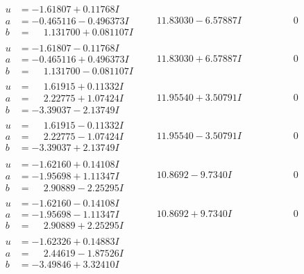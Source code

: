 \documentclass[1p]{elsarticle_modified}
\theoremstyle{definition}
\begin{document}
$$\begin{array}{c|c|c}
\begin{aligned}
u &= -1.61807 + 0.11768 I \\
a &= -0.465116 - 0.496373 I \\
b &= \phantom{-}1.131700 + 0.081107 I\end{aligned}
 & \phantom{-}11.83030 - 6.57887 I & \phantom{-0.000000 } 0 \\ \hline\begin{aligned}
u &= -1.61807 - 0.11768 I \\
a &= -0.465116 + 0.496373 I \\
b &= \phantom{-}1.131700 - 0.081107 I\end{aligned}
 & \phantom{-}11.83030 + 6.57887 I & \phantom{-0.000000 } 0 \\ \hline\begin{aligned}
u &= \phantom{-}1.61915 + 0.11332 I \\
a &= \phantom{-}2.22775 + 1.07424 I \\
b &= -3.39037 - 2.13749 I\end{aligned}
 & \phantom{-}11.95540 + 3.50791 I & \phantom{-0.000000 } 0 \\ \hline\begin{aligned}
u &= \phantom{-}1.61915 - 0.11332 I \\
a &= \phantom{-}2.22775 - 1.07424 I \\
b &= -3.39037 + 2.13749 I\end{aligned}
 & \phantom{-}11.95540 - 3.50791 I & \phantom{-0.000000 } 0 \\ \hline\begin{aligned}
u &= -1.62160 + 0.14108 I \\
a &= -1.95698 + 1.11347 I \\
b &= \phantom{-}2.90889 - 2.25295 I\end{aligned}
 & \phantom{-}10.8692 - 9.7340 I & \phantom{-0.000000 } 0 \\ \hline\begin{aligned}
u &= -1.62160 - 0.14108 I \\
a &= -1.95698 - 1.11347 I \\
b &= \phantom{-}2.90889 + 2.25295 I\end{aligned}
 & \phantom{-}10.8692 + 9.7340 I & \phantom{-0.000000 } 0 \\ \hline\begin{aligned}
u &= -1.62326 + 0.14883 I \\
a &= \phantom{-}2.44619 - 1.87526 I \\
b &= -3.49846 + 3.32410 I\end{aligned}

\end{array}$$
\end{document}
